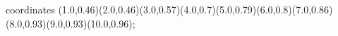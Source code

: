 					coordinates { (1.0,0.46)(2.0,0.46)(3.0,0.57)(4.0,0.7)(5.0,0.79)(6.0,0.8)(7.0,0.86)(8.0,0.93)(9.0,0.93)(10.0,0.96)};
